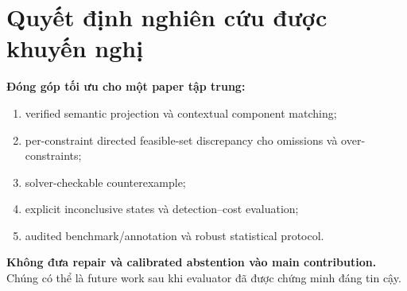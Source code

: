 \documentclass[11pt,a4paper]{article}
\begin{document}
\section{Quyết định nghiên cứu được khuyến nghị}

\begin{takeaway}
\textbf{Đóng góp tối ưu cho một paper tập trung:}

\begin{enumerate}
  \item verified semantic projection và contextual component matching;
  \item per-constraint directed feasible-set discrepancy cho omissions và
  over-constraints;
  \item solver-checkable counterexample;
  \item explicit inconclusive states và detection--cost evaluation;
  \item audited benchmark/annotation và robust statistical protocol.
\end{enumerate}

\textbf{Không đưa repair và calibrated abstention vào main contribution.}
Chúng có thể là future work sau khi evaluator đã được chứng minh đáng tin cậy.
\end{takeaway}

\printbibliography[title={Tài liệu tham khảo}]
\end{document}

